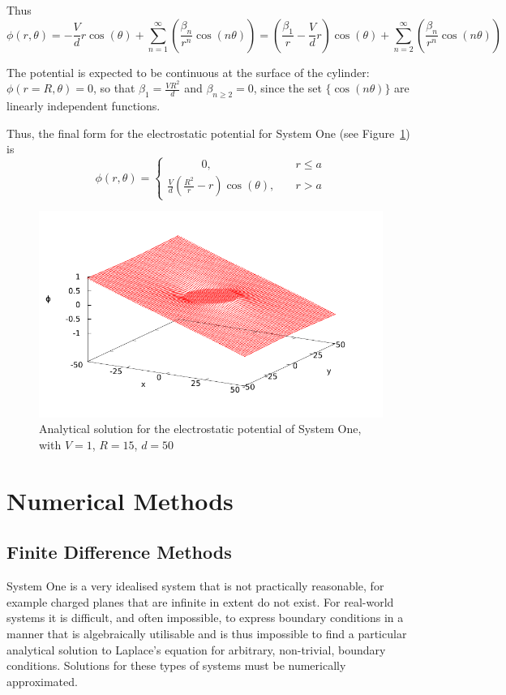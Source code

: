 \documentclass[11pt, a4paper]{article}
\newcommand{\be}{\begin{equation}}
\newcommand{\ee}{\end{equation}}
\begin{document}
Thus
%
\be
\phi(r,\theta)=-\frac{V}{d}r\cos(\theta) + \sum_{n=1}^{\infty}(\frac{\beta_n}{r^n} \cos(n\theta))
              =(\frac{\beta_1}{r}-\frac{V}{d}r)\cos(\theta) + \sum_{n=2}^{\infty}(\frac{\beta_n}{r^n} \cos(n\theta))
\ee

The potential is expected to be continuous at the surface of the cylinder:
$\phi(r=R,\theta)=0$, so that $\beta_1=\frac{VR^2}{d}$ and $\beta_{n \geq 2}=0$,
since the set $\{\cos(n\theta)\}$ are linearly independent functions.

Thus, the final form for the electrostatic potential for System One (see
Figure~\ref{fig:analytic}) is
%
\be
\phi(r,\theta)=
\begin{cases} \quad \qquad 0, & \quad r \leq a \\
\frac{V}{d}(\frac{R^2}{r}-r)\cos(\theta), & \quad r > a
\end{cases}
\ee

\begin{figure}
\begin{center}
\includegraphics{analytic.pdf}
\caption{Analytical solution for the electrostatic potential of System One, with $V=1$,
$R=15$, $d=50$}
\label{fig:analytic}
\end{center}
\end{figure}

\section{Numerical Methods}
\subsection{Finite Difference Methods}

System One is a very idealised system that is not practically reasonable, for example
charged planes that are infinite in extent do not exist. For real-world systems
it is difficult, and often impossible, to express boundary conditions in a manner that
is algebraically utilisable and is thus impossible to find a particular analytical
solution to Laplace's equation for arbitrary, non-trivial, boundary conditions. Solutions
for these types of systems must be numerically approximated.
\end{document}
